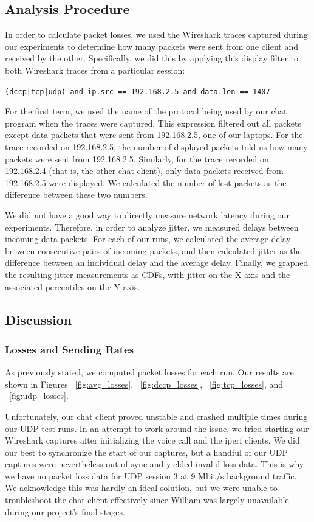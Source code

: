 \subsection{Analysis Procedure}

In order to calculate packet losses, we used the Wireshark traces captured
during our experiments to determine how many packets were sent from one client
and received by the other. Specifically, we did this by applying this display
filter to both Wireshark traces from a particular session:

\texttt{(dccp|tcp|udp) and ip.src == 192.168.2.5 and data.len == 1407}

For the first term, we used the name of the protocol being used by our chat
program when the traces were captured. This expression filtered out all packets except data packets that were sent from
192.168.2.5, one of our laptops. For the trace recorded on 192.168.2.5, the
number of displayed packets told us how many packets were sent from 192.168.2.5.
Similarly, for the trace recorded on 192.168.2.4 (that is, the other chat
client), only data packets received from 192.168.2.5 were displayed. We
calculated the number of lost packets as the difference between these two
numbers.

We did not have a good way to directly measure network latency during our
experiments. Therefore, in order to analyze jitter, we measured delays between
incoming data packets. For each of our runs, we calculated the average delay
between consecutive pairs of incoming packets, and then calculated jitter as the
difference between an individual delay and the average delay. Finally, we
graphed the resulting jitter measurements as CDFs, with jitter on the X-axis and
the associated percentiles on the Y-axis.

\subsection{Discussion}

\subsubsection{Losses and Sending Rates}

As previously stated, we computed packet losses for each run. Our results are
shown in Figures ~\ref{fig:avg_losses}, ~\ref{fig:dccp_losses},
~\ref{fig:tcp_losses}, and ~\ref{fig:udp_losses}.

Unfortunately, our chat client proved unstable and crashed multiple times during
our UDP test runs. In an attempt to work around the issue, we tried starting our
Wireshark captures after initializing the voice call and the iperf clients. We
did our best to synchronize the start of our captures, but a handful of our UDP
captures were nevertheless out of sync and yielded invalid loss data. This is
why we have no packet loss data for UDP session 3 at 9 Mbit/s background
traffic. We acknowledge this was hardly an ideal solution, but we were unable to
troubleshoot the chat client effectively since William was largely unavailable
during our project's final stages.

